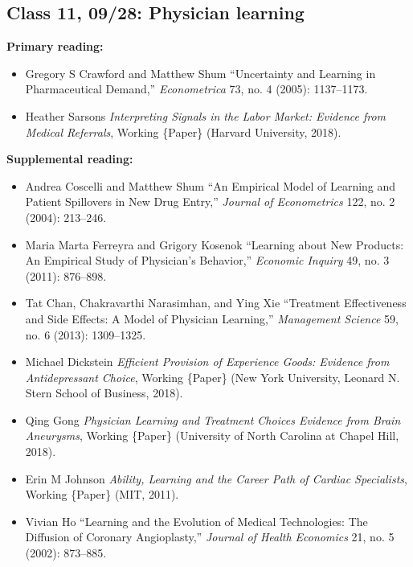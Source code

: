 \documentclass[11pt,]{article}
\providecommand{\tightlist}{%
  \setlength{\itemsep}{0pt}\setlength{\parskip}{0pt}}
\begin{document}
\hypertarget{class-11-0928-physician-learning}{%
\subsection{Class 11, 09/28: Physician
learning}\label{class-11-0928-physician-learning}}

\textbf{Primary reading:}

\begin{itemize}
\tightlist
\item
  Gregory S Crawford and Matthew Shum {``Uncertainty and Learning in
  Pharmaceutical Demand,''} \emph{Econometrica} 73, no. 4 (2005):
  1137--1173.
\item
  Heather Sarsons \emph{Interpreting {Signals} in the {Labor} {Market}:
  {Evidence} from {Medical} {Referrals}}, Working \{Paper\} (Harvard
  University, 2018).
\end{itemize}

\textbf{Supplemental reading:}

\begin{itemize}
\tightlist
\item
  Andrea Coscelli and Matthew Shum {``An Empirical Model of Learning and
  Patient Spillovers in New Drug Entry,''} \emph{Journal of
  Econometrics} 122, no. 2 (2004): 213--246.
\item
  Maria Marta Ferreyra and Grigory Kosenok {``Learning about {New}
  {Products}: {An} {Empirical} {Study} of {Physician}'s {Behavior},''}
  \emph{Economic Inquiry} 49, no. 3 (2011): 876--898.
\item
  Tat Chan, Chakravarthi Narasimhan, and Ying Xie {``Treatment
  Effectiveness and Side Effects: {A} Model of Physician Learning,''}
  \emph{Management Science} 59, no. 6 (2013): 1309--1325.
\item
  Michael Dickstein \emph{Efficient Provision of Experience Goods:
  {Evidence} from Antidepressant Choice}, Working \{Paper\} (New York
  University, Leonard N. Stern School of Business, 2018).
\item
  Qing Gong \emph{Physician {Learning} and {Treatment} {Choices}
  {Evidence} from {Brain} {Aneurysms}}, Working \{Paper\} (University of
  North Carolina at Chapel Hill, 2018).
\item
  Erin M Johnson \emph{Ability, {Learning} and the {Career} {Path} of
  {Cardiac} {Specialists}}, Working \{Paper\} (MIT, 2011).
\item
  Vivian Ho {``Learning and the Evolution of Medical Technologies: The
  Diffusion of Coronary Angioplasty,''} \emph{Journal of Health
  Economics} 21, no. 5 (2002): 873--885.
\end{itemize}
\end{document}
